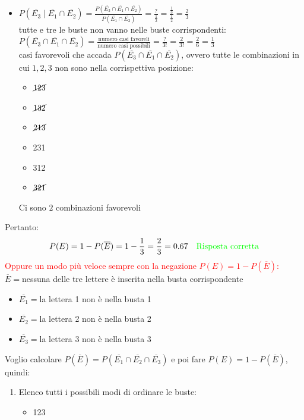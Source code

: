 \documentclass{article}  %
\theoremstyle{definition}
\begin{document}
\begin{esercizio}[Esercizio]
\begin{itemize}
		\item $P(\overline{E_3} \mid \overline{E_1} \cap \overline{E_2})=\frac{P(\overline{E_3} \cap \overline{E_1} \cap \overline{E_2})}{P(\overline{E_1} \cap \overline{E_2})}
			      =\frac{?}{\frac{1}{2}}=\frac{\frac{1}{3}}{\frac{1}{2}}=\frac{2}{3}$ \\
		      tutte e tre le buste non vanno nelle buste corrispondenti: \\
		      $P(\overline{E_3} \cap \overline{E_1} \cap \overline{E_2})=\frac{\text{numero casi favoreli}}{\text{numero casi possibili}}=\frac{?}{3!}=\frac{2}{3!}=\frac{2}{6}=\frac{1}{3}$ \\
		      casi favorevoli che accada $P(\overline{E_3} \cap \overline{E_1} \cap \overline{E_2})$, ovvero tutte le combinazioni in cui $1,2,3$ non sono nella corrispettiva posizione:
		      \begin{itemize}
			      \item $\cancel{123}$
			      \item $\cancel{132}$
			      \item $\cancel{213}$
			      \item 231
			      \item 312
			      \item $\cancel{321}$
		      \end{itemize}
		      Ci sono $2$ combinazioni favorevoli
	\end{itemize}
	Pertanto:
	\[
		P(E)=1-P(\overline{E})=1-\frac{1}{3}=\frac{2}{3}=0.67 \quad \textcolor{green}{\text{Risposta corretta}}
	\]
	\textcolor{red}{Oppure un modo più veloce sempre con la negazione $P(E)=1-P(\overline{E})$:} \\
	$\overline{E}=$nessuna delle tre lettere è inserita nella busta corrispondente
	\begin{itemize}
		\item $\overline{E_1}=$la lettera 1 non è nella busta 1
		\item $\overline{E_2}=$la lettera 2 non è nella busta 2
		\item $\overline{E_3}=$la lettera 3 non è nella busta 3
	\end{itemize}
	Voglio calcolare $P(\overline{E})=P(\overline{E_1} \cap \overline{E_2} \cap \overline{E_3})$ e poi fare $P(E)=1-P(\overline{E})$, quindi:
	\begin{enumerate}
		\item Elenco tutti i possibili modi di ordinare le buste:
		      \begin{itemize}
			      \item 123

\end{itemize}
\end{enumerate}
\end{esercizio}
\end{document}
